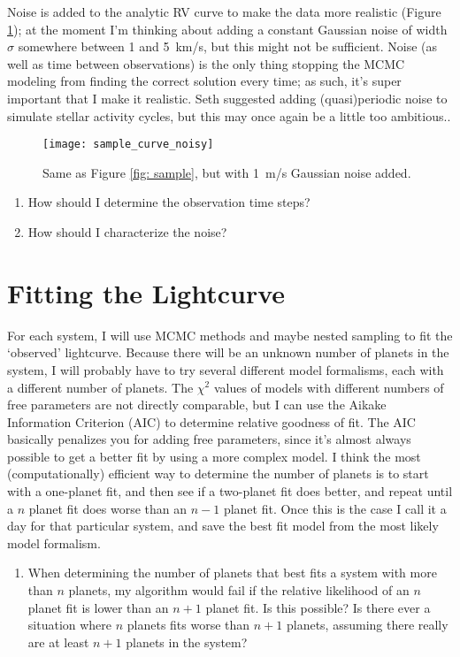 \documentclass[12pt,modern]{article}
\begin{document}
Noise is added to the analytic RV curve to make the data more realistic (Figure \ref{fig: noisy_sample}); at the moment I'm thinking about adding a constant Gaussian noise of width $\sigma$ somewhere between 1 and \SI{5}{km/s}, but this might not be sufficient. Noise (as well as time between observations) is the only thing stopping the MCMC modeling from finding the correct solution every time; as such, it's super important that I make it realistic. Seth suggested adding (quasi)periodic noise to simulate stellar activity cycles, but this may once again be a little too ambitious..

\begin{figure}
  \texttt{[image: sample\_curve\_noisy]}
  \caption{Same as Figure \ref{fig: sample}, but with \SI{1}{m/s} Gaussian noise added.}
  \label{fig: noisy_sample}
\end{figure}


\begin{enumerate}
  \item How should I determine the observation time steps?
  \item How should I characterize the noise?
\end{enumerate}


\section{Fitting the Lightcurve}
\label{sec: (3)}

For each system, I will use MCMC methods and maybe nested sampling to fit the `observed' lightcurve. 
Because there will be an unknown number of planets in the system, I will probably have to try several different model formalisms, each with a different number of planets. 
The $\chi^2$ values of models with different numbers of free parameters are not directly comparable, but I can use the Aikake Information Criterion (AIC) to determine relative goodness of fit. 
The AIC basically penalizes you for adding free parameters, since it's almost always possible to get a better fit by using a more complex model. 
I think the most (computationally) efficient way to determine the number of planets is to start with a one-planet fit, and then see if a two-planet fit does better, and repeat until a $n$ planet fit does worse than an $n-1$ planet fit. Once this is the case I call it a day for that particular system, and save the best fit model from the most likely model formalism.

\begin{enumerate}
  \item When determining the number of planets that best fits a system with more than $n$ planets, my algorithm would fail if the relative likelihood of an $n$ planet fit is lower than an $n+1$ planet fit. Is this possible? Is there ever a situation where $n$ planets fits worse than $n+1$ planets, assuming there really are at least $n+1$ planets in the system?
\end{enumerate}
\end{document}
